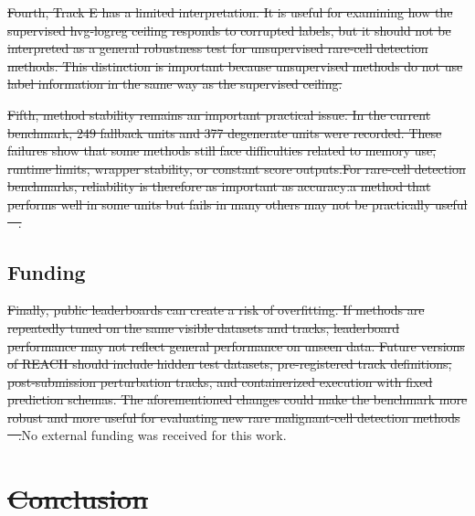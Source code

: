 \documentclass[10pt]{article}
\providecommand{\DIFaddtex}[1]{{\protect\color{trackgreen}#1}} %
\providecommand{\DIFdeltex}[1]{{\protect\color{red}\sout{#1}}}                      %
\providecommand{\DIFaddbegin}{} %
\providecommand{\DIFaddend}{} %
\providecommand{\DIFdelbegin}{} %
\providecommand{\DIFdelend}{} %
\providecommand{\DIFadd}[1]{\texorpdfstring{\DIFaddtex{#1}}{#1}} %
\providecommand{\DIFdel}[1]{\texorpdfstring{\DIFdeltex{#1}}{}} %
\newcommand{\DIFscaledelfig}{0.5}
\newlength{\DIFdelgraphicswidth} %
\newlength{\DIFdelgraphicsheight} %
\newcommand{\DIFaddincludegraphics}[2][]{{\color{trackgreen}\fbox{\DIFOincludegraphics[#1]{#2}}}} %
\newcommand{\DIFdelincludegraphics}[2][]{%
\sbox{\DIFdelgraphicsbox}{\DIFOincludegraphics[#1]{#2}}%
\settoboxwidth{\DIFdelgraphicswidth}{\DIFdelgraphicsbox} %
\settoboxtotalheight{\DIFdelgraphicsheight}{\DIFdelgraphicsbox} %
\scalebox{\DIFscaledelfig}{%
\parbox[b]{\DIFdelgraphicswidth}{\usebox{\DIFdelgraphicsbox}\\[-\baselineskip] \rule{\DIFdelgraphicswidth}{0em}}\llap{\resizebox{\DIFdelgraphicswidth}{\DIFdelgraphicsheight}{%
\setlength{\unitlength}{\DIFdelgraphicswidth}%
\begin{picture}(1,1)%
\thicklines\linethickness{2pt} %
{\color[rgb]{1,0,0}\put(0,0){\framebox(1,1){}}}%
{\color[rgb]{1,0,0}\put(0,0){\line( 1,1){1}}}%
{\color[rgb]{1,0,0}\put(0,1){\line(1,-1){1}}}%
\end{picture}%
}\hspace*{3pt}}} %
} %
\DeclareRobustCommand{\DIFaddbegin}{\DIFOaddbegin \let\includegraphics\DIFaddincludegraphics} %
\DeclareRobustCommand{\DIFaddend}{\DIFOaddend \let\includegraphics\DIFOincludegraphics} %
\DeclareRobustCommand{\DIFdelbegin}{\DIFOdelbegin \let\includegraphics\DIFdelincludegraphics} %
\DeclareRobustCommand{\DIFdelend}{\DIFOaddend \let\includegraphics\DIFOincludegraphics} %
\begin{document}
\DIFdelbegin \DIFdel{Fourth, Track E has a limited interpretation. It is useful for examining how the supervised hvg-logreg ceiling responds to corrupted labels, but it should not be interpreted as a general robustness test for unsupervised rare-cell detection methods. This distinction is important because unsupervised methods do not use label information in the same way as the supervised ceiling. }\DIFdelend \DIFaddbegin \begin{center}\DIFadd{\rule{0.5\linewidth}{0.5pt}}\end{center}
\DIFaddend 

\DIFdelbegin \DIFdel{Fifth, method stability remains an important practical issue. In the current benchmark, 249 fallback units and 377 degenerate units were recorded. These failures show that some methods still face difficulties related to
  memory use, runtime limits,
wrapper stability, or constant score outputs.For rare-cell detection benchmarks, reliability is therefore as important as accuracy:a method that performs well in some units but fails in many others may not be practically useful \mbox{%
\cite{tran2020benchmark,everingham2010pascal}}\hskip0pt%
.}\DIFdelend \DIFaddbegin \subsection{\DIFadd{Funding}}\label{funding}
\DIFaddend 

\DIFdelbegin \DIFdel{Finally, public leaderboards can create a risk of overfitting. If methods are repeatedly tuned on the same visible datasets and tracks, leaderboard performance may not reflect general performance on unseen data. Future versions of REACH should include hidden test datasets, pre-registered track definitions, post-submission perturbation tracks, and containerized execution with fixed prediction schemas. The aforementioned changes could make the benchmark more robust and more useful for evaluating new rare malignant-cell detection methods \mbox{%
\cite{song2023benchmarking,li2023comprehensive}}\hskip0pt%
.}\DIFdelend \DIFaddbegin \DIFadd{No external funding was received for this work.
}\DIFaddend 

\DIFdelbegin \section{\DIFdel{Conclusion}}
\addtocounter{section}{-1}%
\DIFdelend \DIFaddbegin \begin{center}\DIFadd{\rule{0.5\linewidth}{0.5pt}}\end{center}
\DIFaddend 
\end{document}
